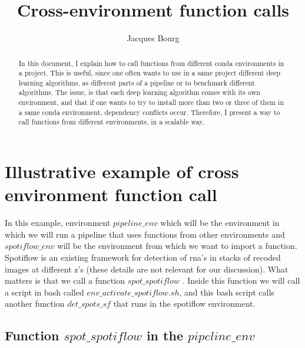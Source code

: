 \documentclass[24pt]{article}
\title{Cross-environment function calls}
\author{Jacques Bourg}
\begin{document}
\maketitle

\begin{abstract}
 In this document, I explain how to call functions from different conda environments in a project. This is useful, since one often wants to use in a same project different deep learning algorithms, as different parts of a pipeline or to benchmark different algorithms. The issue, is that each deep learning algorithm  comes with its own environment, and that if one wants to try to install more than two or three of them in a same conda environment, dependency conflicts occur. Therefore, I present a way to call functions from different environments, in a scalable way.
\end{abstract}


\section{Illustrative example of cross environment function call}

In this example, environment $pipeline\_env$ which will be the environment in which we will run a pipeline that uses functions from other environments and $spotiflow\_env$ will be the environment from which we want to import a function. Spotiflow is an existing framework for detection of rna's in stacks of recoded images at different z's (these details are not relevant for our discussion). 
What matters is that we call a function $spot\_spotiflow$ . Inside this function we will call a script in bash 
called $env\_activate\_spotiflow.sh$, and this bash script calls another function  $det\_spots\_sf$ that runs in the spotiflow environment.



\subsection{Function $spot\_spotiflow$ in the $pipeline\_env $}
 
\end{document}
